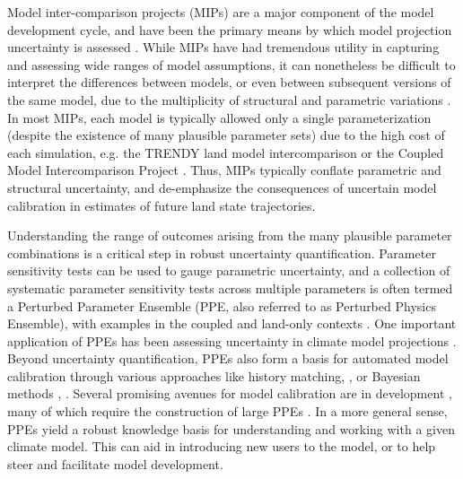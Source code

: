 \documentclass[draft]{agujournal2019}
\begin{document}
Model inter-comparison projects (MIPs) are a major component of the model development cycle, and have been the primary means by which model projection uncertainty is assessed \cite{henderson-sellers1995,pitman1999,wood1998,schlosser2000,eyring2016,friedlingstein2022}. While MIPs have had tremendous utility in capturing and assessing wide ranges of model assumptions, it can nonetheless be difficult to interpret the differences between models, or even between subsequent versions of the same model, due to the multiplicity of structural and parametric variations \cite{mcneall2016}. In most MIPs, each model is typically allowed only a single parameterization (despite the existence of many plausible parameter sets) due to the high cost of each simulation, e.g. the TRENDY land model intercomparison \cite{sitch2024} or the Coupled Model Intercomparison Project \cite{eyring2016}. Thus, MIPs typically conflate parametric and structural uncertainty, and de-emphasize the consequences of uncertain model calibration in estimates of future land state trajectories. 

Understanding the range of outcomes arising from the many plausible parameter combinations is a critical step in robust uncertainty quantification. Parameter sensitivity tests can be used to gauge parametric uncertainty, and a collection of systematic parameter sensitivity tests across multiple parameters is often termed a Perturbed Parameter Ensemble (PPE, also referred to as Perturbed Physics Ensemble), with examples in the coupled \cite{murphy2004} and land-only contexts  \cite{dagon2020,baker2022,mcneall2024}. 
One important application of PPEs has been assessing uncertainty in climate model projections \cite{murphy2004,sanderson2008,booth2012,hawkins2019,yamazaki2021,peatier2022,tett2022}.
Beyond uncertainty quantification, PPEs also form a basis for automated model calibration through various approaches like history matching,  \cite{williamson2013,williamson2017,hourdin2020,couvreux2021,mcneall2024}, or Bayesian methods  \cite{ziehn2012,fer2018,cleary2021},  \cite{bastrikov2018}.
Several promising avenues for model calibration are in development \cite{pinnington2020,cleary2021,alonso-gonzalez2022}, many of which require the construction of large PPEs \cite{qian2018}.
In a more general sense, PPEs yield a robust knowledge basis for understanding and working with a given climate model. This can aid in introducing new users to the model, or to help steer and facilitate model development.
\end{document}

